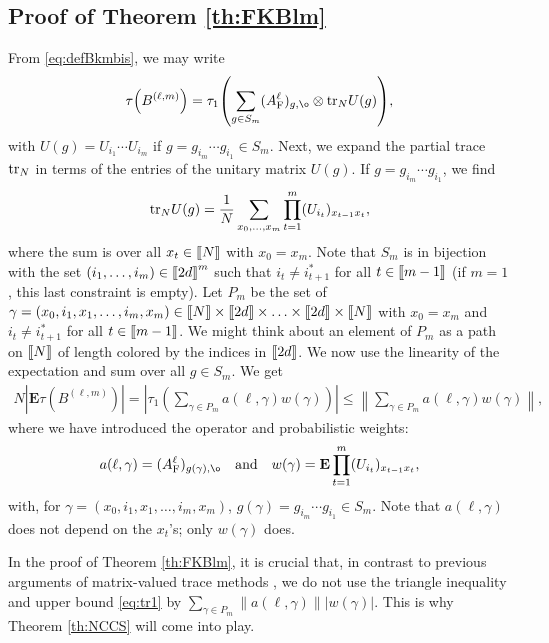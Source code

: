 \documentclass[11pt]{article}
\renewcommand{\star}{{\mathrm{F}}}
\newcommand{\tr}{{\rm tr}}
\newcommand{\dE}{\mathbf {E}}
\newcommand{\ABS}[1]{{{\left| #1 \right|}}} %
\newcommand{\NRM}[1]{{{\left\| #1\right\|}}} %
\newcommand{\PAR}[1]{{{\left(#1\right)}}} %
\newcommand{\AND}{\quad \mathrm{and} \quad}
\newcommand{\1}{1\!\!{\sf I}}
\newcommand{\INT}[1]{{{\left[\hspace{-1.4pt}\left[#1\right]\hspace{-1.4pt}\right]}}}
\begin{document}
\subsection{Proof of Theorem \ref{th:FKBlm}}\label{subsec:th7}
From  \eqref{eq:defBkmbis}, we may write
$$
\tau \PAR{ B^{(\ell,m)} } =  \tau_1 \PAR{   \sum_{g \in S_m}  (A_\star^\ell)_{g , \o} \otimes \tr_N U (g) },
$$
with $U(g) = U_{i_1} \cdots U_{i_m}$ if $g = g_{i_m}\cdots g_{i_1} \in S_m$. 
Next, we expand the partial trace $\tr_N$ in terms of the entries of the unitary matrix $U(g)$. If $g = g_{i_m} \cdots g_{i_1}$, we find
$$
\tr_N U(g) = \frac 1 N  \sum_{x_0,\ldots,x_m} \prod_{t=1}^m (U_{i_t})_{x_{t-1} x_t},
$$
where the sum is over all $x_t \in \INT{N}$ with $x_0 = x_m$. 
Note that $S_m$ is in bijection with the set $(i_1,\ldots,i_m) \in \INT{2d}^m$ such that $i_{t} \ne i^*_{t+1}$ for all $t \in \INT{m-1}$ (if $m = 1$, this last constraint is empty). Let  $P_m$ be the set of  $\gamma = (x_0,i_1,x_1,\ldots,i_m, x_m) \in \INT{N} \times \INT{2d} \times \ldots \times \INT{2d} \times \INT{N}$ with $x_0 = x_m$ and $i_{t} \ne i^*_{t+1}$ for all $t \in \INT{m-1}$. We might think about an element of $P_m$ as a path on $\INT{N}$ of length colored by the indices in $\INT{2d}$.  We now use the linearity of the expectation and sum over all $g \in S_m$. We get
\begin{eqnarray}
N \ABS{ \dE \tau \PAR{ B^{(\ell,m)} }  } = \ABS{  \tau_1  \PAR{ \sum_{\gamma  \in P_m}   a(\ell,\gamma)  w(\gamma) } } \leq    \NRM{  \sum_{\gamma  \in P_m}   a(\ell,\gamma)  w(\gamma) },\label{eq:tr1}
\end{eqnarray}
where we have introduced the operator and probabilistic weights: 
\begin{equation}\label{eq:defapgamma}
a(\ell,\gamma) = (A_\star^\ell)_{g(\gamma) , \o} \AND w(\gamma) =   \dE \prod_{t=1}^m (U_{i_t})_{x_{t-1} x_t},
\end{equation}
with, for $\gamma = (x_0,i_1,x_1,\ldots,i_m, x_m) $,  $g(\gamma) = g_{i_m}\cdots g_{i_1} \in S_m$. 
Note that $a(\ell,\gamma)$ does not depend on the $x_t$'s; only $w(\gamma)$ does. 


In the proof of Theorem \ref{th:FKBlm}, it is crucial that, in contrast to previous arguments of matrix-valued trace methods \cite{MR4024563,BC2}, we do not use the triangle inequality and upper bound \eqref{eq:tr1} by  $\sum_{\gamma  \in P_m}  \NRM{  a(\ell,\gamma)}  | w(\gamma) |$. This is why Theorem \ref{th:NCCS} will come into play.
\end{document}
